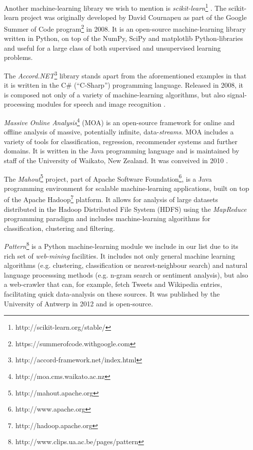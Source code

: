 Another machine-learning library we wish to mention is
\emph{scikit-learn}\footnote{http://scikit-learn.org/stable/} \cite{scikit}. The
scikit-learn project was originally developed by David Cournapeu as part of the
Google Summer of Code program\footnote{https://summerofcode.withgoogle.com} in
2008. It is an open-source machine-learning library written in Python, on top of
the NumPy, SciPy and matplotlib Python-libraries and useful for a large class of
both supervised and unsupervised learning problems.

The \emph{Accord.NET}\footnote{http://accord-framework.net/index.html} library
stands apart from the aforementioned examples in that it is written in the C\#
(``C-Sharp'') programming language. Released in 2008, it is composed not only of
a variety of machine-learning algorithms, but also signal-processing modules for
speech and image recognition \cite{accord}.

\emph{Massive Online Analysis}\footnote{http://moa.cms.waikato.ac.nz} (MOA) is
an open-source framework for online and offline analysis of massive, potentially
infinite, data-\emph{streams}. MOA includes a variety of tools for
classification, regression, recommender systems and further domains. It is
written in the Java programming language and is maintained by staff of the
University of Waikato, New Zealand. It was conveived in 2010 \cite{moa}.

The \emph{Mahout}\footnote{http://mahout.apache.org} project, part of Apache
Software Foundation\footnote{http://www.apache.org}, is a Java programming
environment for scalable machine-learning applications, built on top of the
Apache Hadoop\footnote{http://hadoop.apache.org} platform. It allows for
analysis of large datasets distributed in the Hadoop Distributed File System
(HDFS) using the \emph{MapReduce} programming paradigm and includes
machine-learning algorithms for classification, clustering and filtering.

\emph{Pattern}\footnote{http://www.clips.ua.ac.be/pages/pattern} is a Python
machine-learning module we include in our list due to its rich set of
\emph{web-mining} facilities. It includes not only general machine learning
algorithms (e.g. clustering, classification or nearest-neighbour search) and
natural language processsing methods (e.g. n-gram search or sentiment analysis),
but also a web-crawler that can, for example, fetch Tweets and Wikipedia
entries, facilitating quick data-analysis on these sources. It was published by
the University of Antwerp in 2012 and is open-source.

